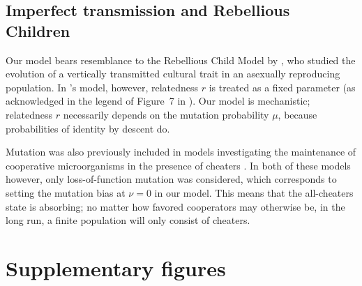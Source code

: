\documentclass[11pt, letterpaper]{article}
\newcommand{\mutbias}{\nu}
\begin{document}
\subsection*{Imperfect transmission and Rebellious Children}
Our model bears resemblance to the Rebellious Child Model by \citet{Frank1997}, who studied the evolution of a vertically transmitted cultural trait in an asexually reproducing population. In \citeauthor{Frank1997}'s model, however, relatedness $r$ is treated as a fixed parameter (as acknowledged in the legend of Figure~7 in \citet{Frank1997}). 
Our model is mechanistic; relatedness $r$ necessarily depends on the mutation probability $\mu$, because probabilities of identity by descent do. 

Mutation was also previously included in models investigating the maintenance of cooperative microorganisms in the presence of cheaters \citep{Brockhurst2007, Frank2010}. In both of these models however, only loss-of-function mutation was considered, which corresponds to setting the mutation bias at $\mutbias=0$ in our model. This means that the all-cheaters state is absorbing; no matter how favored cooperators may otherwise be, in the long run, a finite population will only consist of cheaters. 



\clearpage




\clearpage


\appendix
 
\renewcommand{\theequation}{\thesection.\arabic{equation}}
\setcounter{equation}{0}  %
 
\renewcommand{\thefigure}{S\arabic{figure}}
\setcounter{figure}{0}

\section*{Supplementary figures} 
\end{document}
